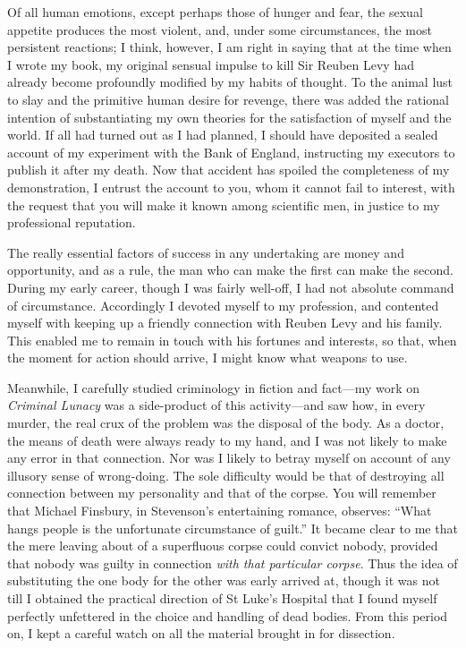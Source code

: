 Of all human emotions, except perhaps those of hunger and fear, the sexual appetite produces the most violent, and, under some circumstances, the most persistent reactions; I think, however, I am right in saying that at the time when I wrote my book, my original sensual impulse to kill Sir Reuben Levy had already become profoundly modified by my habits of thought. To the animal lust to slay and the primitive human desire for revenge, there was added the rational intention of substantiating my own theories for the satisfaction of myself and the world. If all had turned out as I had planned, I should have deposited a sealed account of my experiment with the Bank of England, instructing my executors to publish it after my death. Now that accident has spoiled the completeness of my demonstration, I entrust the account to you, whom it cannot fail to interest, with the request that you will make it known among scientific men, in justice to my professional reputation.

The really essential factors of success in any undertaking are money and opportunity, and as a rule, the man who can make the first can make the second. During my early career, though I was fairly well-off, I had not absolute command of circumstance. Accordingly I devoted myself to my profession, and contented myself with keeping up a friendly connection with Reuben Levy and his family. This enabled me to remain in touch with his fortunes and interests, so that, when the moment for action should arrive, I might know what weapons to use.

Meanwhile, I carefully studied criminology in fiction and fact\allowbreak---\allowbreak my work on \textit{Criminal Lunacy} was a side-product of this activity\allowbreak---\allowbreak and saw how, in every murder, the real crux of the problem was the disposal of the body. As a doctor, the means of death were always ready to my hand, and I was not likely to make any error in that connection. Nor was I likely to betray myself on account of any illusory sense of wrong-doing. The sole difficulty would be that of destroying all connection between my personality and that of the corpse. You will remember that Michael Finsbury, in Stevenson’s entertaining romance, observes: \enquote{What hangs people is the unfortunate circumstance of guilt.} It became clear to me that the mere leaving about of a superfluous corpse could convict nobody, provided that nobody was guilty in connection \textit{with that particular corpse}. Thus the idea of substituting the one body for the other was early arrived at, though it was not till I obtained the practical direction of St Luke’s Hospital that I found myself perfectly unfettered in the choice and handling of dead bodies. From this period on, I kept a careful watch on all the material brought in for dissection.

